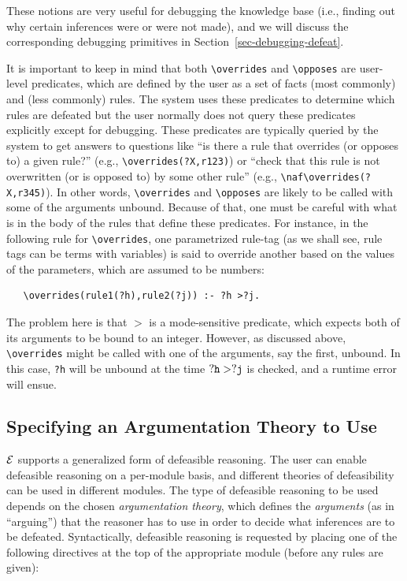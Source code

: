 \documentclass[11pt]{article}
\newcommand{\ERGO}{\mbox{\ensuremath{\cal{E}}\smaller{{\sc{RGO}}}}\xspace}
\newcommand{\FLSYSTEM}{\ERGO}
\newcommand{\bs}{\textbackslash}
\newcommand{\RULELOGNAF}{{\texttt{{\bs}naf}}\xspace}
\begin{document}
These notions are very useful for debugging the knowledge base (i.e., finding out why
certain inferences were or were not made), and we will discuss the
corresponding debugging primitives in Section~\ref{sec-debugging-defeat}.

It is important to keep in mind that both \texttt{\bs{}overrides} and
\texttt{\bs{}opposes} are user-level predicates, which are defined by the
user as a set of facts (most commonly) and (less commonly) rules. The
system uses these predicates to determine which rules are defeated but the
user normally does not query these predicates explicitly except for
debugging.  These predicates are typically queried by the system to get
answers to questions like ``is there a rule that overrides (or opposes to)
a given rule?'' (e.g., \texttt{\bs{}overrides(?X,r123)}) or
``check that this rule is not overwritten (or is opposed to) by some other
rule'' (e.g., \texttt{\RULELOGNAF\bs{}overrides(?X,r345)}).
In other words, \texttt{\bs{}overrides} and \texttt{\bs{}opposes} are
likely to be called with some of the arguments unbound.
Because of that, one must be careful with what is in the body of the rules
that define these predicates. For instance, in the following rule for
\texttt{\bs{}overrides}, one parametrized rule-tag (as we shall see, rule
tags can be terms with variables) is said to override
another based on the values of the parameters, which are assumed to be
numbers:
\begin{verbatim}
   \overrides(rule1(?h),rule2(?j)) :- ?h >?j.
\end{verbatim}
The problem here is that $>$ is a mode-sensitive predicate, which expects
both of its arguments to be bound to an integer. However, as discussed above,
\texttt{\bs{}overrides} might be called with one of the arguments, say
the first, unbound. In this case, \texttt{?h} will be unbound at the time
$\tt ?h>?j$ is checked, and a runtime error will ensue. 


\subsection{Specifying an Argumentation Theory to Use}

\FLSYSTEM supports a generalized form of defeasible reasoning.
The user can enable defeasible reasoning on a per-module basis, and
different theories of defeasibility can be used in different modules.
The type of defeasible reasoning to be used depends on the chosen
\emph{argumentation theory}, which defines the \emph{arguments} (as in
``arguing'') that the reasoner has to use in order to decide what inferences
are to be defeated. Syntactically, defeasible reasoning is requested
by placing one of the following directives at the top of the
appropriate module (before any rules are given):
\end{document}

